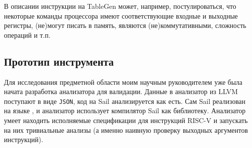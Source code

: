 В описании инструкции на TableGen может, например, постулироваться, что некоторые команды процессора имеют соответствующие входные и выходные регистры, (не)могут писать в память, являются (не)коммутативными, сложность операций и т.п.

\subsection{Прототип инструмента}

Для исследования предметной области моим научным руководителем уже была начата разработка анализатора для валидации.
Данные в анализатор из LLVM поступают в виде \texttt{JSON}, код на Sail анализируется как есть.
Сам Sail реализован на языке \OCaml, и анализатор использует компилятор Sail как библиотеку.
Анализатор умеет находить исполняемые спецификации для инструкций RISC-V и запускать на них тривиальные анализы (а именно наивную проверку выходных аргументов инструкций).







